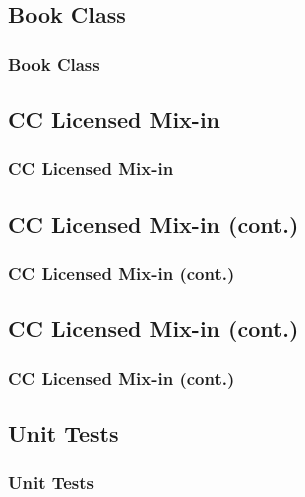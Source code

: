 \documentclass[mathserif,xcolor=dvipsnames,hyperref={bookmarks=true}]{beamer}
\begin{document}
    \subsection{Book Class}
\begin{frame}[fragile]
\frametitle{Book Class}

\end{frame}

    \subsection{CC Licensed Mix-in}
\begin{frame}[fragile]
\frametitle{CC Licensed Mix-in}

\end{frame}

    \subsection{CC Licensed Mix-in (cont.)}
\begin{frame}[fragile]
\frametitle{CC Licensed Mix-in (cont.)}

\end{frame}

    \subsection{CC Licensed Mix-in (cont.)}
\begin{frame}[fragile]
\frametitle{CC Licensed Mix-in (cont.)}

\end{frame}

    \subsection{Unit Tests}
\begin{frame}[fragile]
\frametitle{Unit Tests}

\end{frame}
\end{document}
